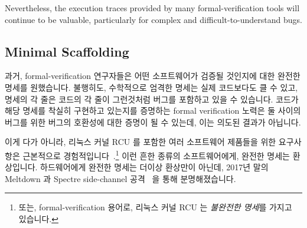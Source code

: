Nevertheless, the execution traces provided
by many formal-verification tools will continue to be valuable,
particularly for complex and difficult-to-understand bugs.
\fi

\subsection{Minimal Scaffolding}
\label{sec:future:Minimal Scaffolding}

과거, formal-verification 연구자들은 어떤 소프트웨어가 검증될 것인지에 대한
완전한 명세를 원했습니다.
불행히도, 수학적으로 엄격한 명세는 실제 코드보다도 클 수 있고, 명세의 각 줄은
코드의 각 줄이 그런것처럼 버그를 포함하고 있을 수 있습니다.
코드가 해당 명세를 착실히 구현하고 있는지를 증명하는 formal verification 노력은
둘 사이의 버그를 위한 버그의 호환성에 대한 증명이 될 수 있는데, 이는 의도된
결과가 아닙니다.

이게 다가 아니라, 리눅스 커널 RCU 를 포함한 여러 소프트웨어 제품들을 위한
요구사항은 근본적으로
경험적입니다~\cite{PaulEMcKenney2015RCUreqts1,PaulEMcKenney2015RCUreqts2,PaulEMcKenney2015RCUreqts3}.\footnote{
	또는, formal-verification 용어로, 리눅스 커널 RCU 는 \emph{불완전한
	명세}를 가지고 있습니다.}
이런 흔한 종류의 소프트웨어에게, 완전한 명세는 환상입니다.
하드웨어에게 완전한 명세는 더이상 환상만이 아닌데, 2017년 말의 Meltdown 과
Spectre side-channel 공격~\cite{JannHorn2018MeltdownSpectre} 을 통해
분명해졌습니다.
\iffalse

In the old days, formal-verification researchers demanded a full
specification against which the software would be verified.
Unfortunately, a mathematically rigorous specification might well
be larger than the actual code, and each line of specification
is just as likely to contain bugs as is each line of code.
A formal verification effort proving that the code faithfully
implemented the specification would be a proof of bug-for-bug
compatibility between the two, which might not be the intended
result.

Worse yet, the requirements for a number of software artifacts,
including Linux-kernel RCU, are empirical in
nature~\cite{PaulEMcKenney2015RCUreqts1,PaulEMcKenney2015RCUreqts2,PaulEMcKenney2015RCUreqts3}.\footnote{
	Or, in formal-verification parlance, Linux-kernel RCU has an
	\emph{incomplete specification}.}
For this common type of software, a complete specification is a
polite fiction.
Nor are complete specifications any less fictional for hardware,
as was made clear by the late 2017 advent of the Meltdown and Spectre
side-channel attacks~\cite{JannHorn2018MeltdownSpectre}.
\fi

